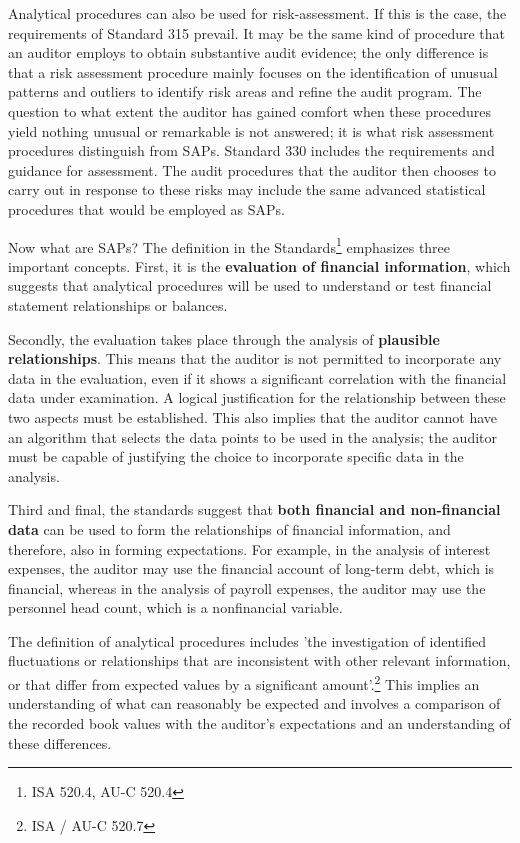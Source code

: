 Analytical procedures can also be used for risk-assessment. If this is the case, the requirements of Standard 315 prevail. It may be the same kind of procedure that an auditor employs to obtain substantive audit evidence; the only difference is that a risk assessment procedure mainly focuses on the identification of unusual patterns and outliers to identify risk areas and refine the audit program. The question to what extent the auditor has gained comfort when these procedures yield nothing unusual or remarkable is not answered; it is what risk assessment procedures distinguish from SAPs. Standard 330 includes the requirements and guidance for assessment. The audit procedures that the auditor then chooses to carry out in response to these risks may include the same advanced statistical procedures that would be employed as SAPs.

\bigskip
Now what are SAPs? The definition in the Standards\footnote{ISA 520.4, AU-C 520.4} emphasizes three important concepts. First, it is the \textbf{evaluation of financial information}, which suggests that analytical procedures will be used to understand or test financial statement relationships or balances.

Secondly, the evaluation takes place through the analysis of \textbf{plausible relationships}. 
This means that the auditor is not permitted to incorporate any data in the evaluation, even if it shows a significant correlation with the financial data under examination. 
A logical justification for the relationship between these two aspects must be established. This also implies that the auditor cannot have an algorithm that selects the data points to be used in the analysis; the auditor must be capable of justifying the choice to incorporate specific data in the analysis.

Third and final, the standards suggest that \textbf{both financial and non-financial data} can be used to form the relationships of financial information, and therefore, also in forming expectations. 
For example, in the analysis of interest expenses, the auditor may use the financial account of long-term debt, which is financial, whereas in the analysis of payroll expenses, the auditor may use the personnel head count, which is a nonfinancial variable.

\bigskip
The definition of analytical procedures includes 'the investigation of identified fluctuations or relationships that are inconsistent with other relevant information, or that differ from expected values by a significant amount'.\footnote{ISA / AU-C 520.7} This implies an understanding of what can reasonably be expected and involves a comparison of the recorded book values with the auditor’s expectations and an understanding of these differences.

